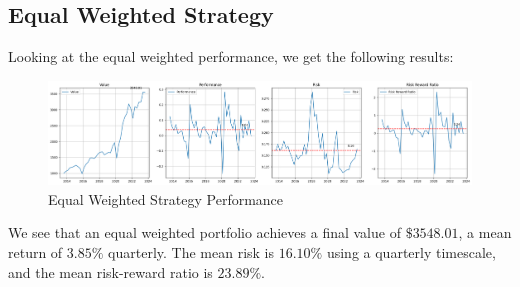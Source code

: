 \documentclass{article}
\begin{document}
\subsection{Equal Weighted Strategy}
\label{subsec:equal-weighted}
Looking at the equal weighted performance, we get the following results:
\begin{figure}[H]
    \centering
    \includegraphics[width=1\textwidth]{equal_weight.png}
    \caption{Equal Weighted Strategy Performance}
    \label{fig:equal_weighted}
\end{figure}
We see that an equal weighted portfolio achieves a final value of $\$3548.01$, a mean return of $3.85\%$ quarterly. The mean risk is $16.10\%$ using a quarterly timescale, and the mean risk-reward ratio is $23.89\%$.
\end{document}
